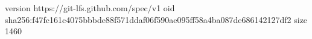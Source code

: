 version https://git-lfs.github.com/spec/v1
oid sha256:f47fc161c4075bbbde88f571ddaf06f590ae095ff58a4ba087de686142127df2
size 1460
